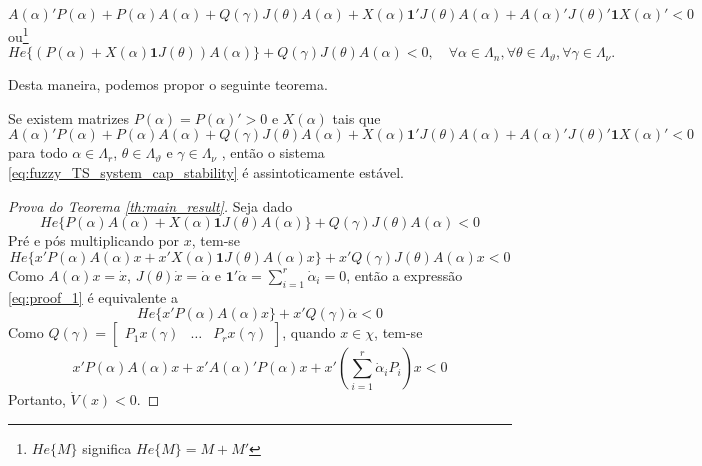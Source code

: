 \begin{equation}\label{eq:dot_V_fuzzy_finsler}
A(\alpha)'P(\alpha) + P(\alpha)A(\alpha) + Q(\gamma)J(\theta)A(\alpha) + X(\alpha)\textbf{1}'J(\theta)A(\alpha) + A(\alpha)'J(\theta)'\textbf{1}X(\alpha)' < 0
\end{equation}
ou\footnote{$He\{M\}$ significa $He\{M\} = M + M'$}
\begin{equation}\label{eq:dot_V_fuzzy_finsler_He}
He\{(P(\alpha) + X(\alpha)\textbf{1}J(\theta))A(\alpha)\} + Q(\gamma)J(\theta)A(\alpha) < 0,\quad \forall\alpha\in\Lambda_n, \forall\theta\in\Lambda_{\vartheta}, \forall\gamma\in\Lambda_{\nu}.
\end{equation}

Desta maneira, podemos propor o seguinte teorema.

\begin{theorem}[Proposto]\label{th:main_result}
 Se existem matrizes $P(\alpha) = P(\alpha)' > 0$ e $X(\alpha)$ tais que
\begin{equation}\label{eq:th1_stability}
A(\alpha)'P(\alpha) + P(\alpha)A(\alpha) + Q(\gamma)J(\theta)A(\alpha) + X(\alpha)\textbf{1}'J(\theta)A(\alpha) + A(\alpha)'J(\theta)'\textbf{1}X(\alpha)' < 0
\end{equation}
para todo $\alpha \in \Lambda_r$, $\theta \in \Lambda_{\vartheta}$ e $\gamma \in\Lambda_{\nu}$ , então o sistema \ref{eq:fuzzy_TS_system_cap_stability} é assintoticamente estável.
\end{theorem}

\begin{proof}[Prova do Teorema \ref{th:main_result}] Seja dado
\begin{equation*}
He\{P(\alpha)A(\alpha) + X(\alpha)\textbf{1}J(\theta)A(\alpha)\} + Q(\gamma)J(\theta)A(\alpha) < 0
\end{equation*}
Pré e pós multiplicando por $x$, tem-se
\begin{equation}\label{eq:proof_1}
He\{x'P(\alpha)A(\alpha)x + x'X(\alpha)\textbf{1}J(\theta)A(\alpha)x\} + x'Q(\gamma)J(\theta)A(\alpha)x < 0
\end{equation}
Como $A(\alpha)x = \dot{x}$, $J(\theta)\dot{x} = \dot{\alpha}$ e $\textbf{1}'\dot{\alpha} = \sum_{i = 1}^{r}\dot{\alpha}_i = 0$, então a expressão \ref{eq:proof_1} é equivalente a
\begin{equation*}
He\{x'P(\alpha)A(\alpha)x\} + x'Q(\gamma)\dot{\alpha} < 0
\end{equation*}
Como $Q(\gamma) = \begin{bmatrix}P_1x(\gamma)&\hdots&P_rx(\gamma)\end{bmatrix}$, quando $x \in \chi$, tem-se
\begin{equation*}
x'P(\alpha)A(\alpha)x + x'A(\alpha)'P(\alpha)x + x'(\sum_{i = 1}^{r}\dot{\alpha}_iP_i)x < 0
\end{equation*}
Portanto, $\dot{V}(x) < 0$.
\end{proof}

